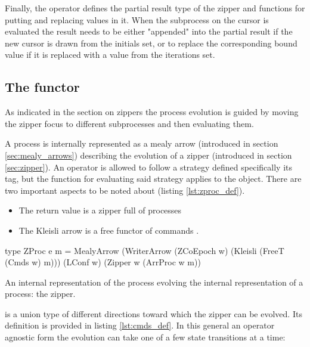 Finally, the operator defines the partial result type of the zipper
 and functions for putting and replacing values in
it. When the subprocess on the cursor is evaluated the result needs to
be either "appended" into the partial result if the new cursor is
drawn from the initials set, or to replace the corresponding bound
value if it is replaced with a value from the iterations set.

\subsection{The  functor}
\label{sec:cmds_functor}

As indicated in the section on zippers the process evolution is guided
by moving the zipper focus to different subprocesses and then
evaluating them.

A process is internally represented as a mealy arrow (introduced in
section \ref{sec:mealy_arrows}) describing the evolution of a zipper
(introduced in section \ref{sec:zipper}). An operator is allowed to
follow a strategy defined specifically its  tag,
but the function for evaluating said strategy applies to the
 object. There are two important aspects to be noted about
 (listing \ref{lst:zproc_def}).

\begin{itemize}
\item The return value is a zipper full of processes 
\item The Kleisli arrow is a free functor of commands .
\end{itemize}

\begin{code}
\begin{haskellcode}
type ZProc e m =
  MealyArrow
    (WriterArrow (ZCoEpoch w) (Kleisli (FreeT (Cmds w) m)))
    (LConf w)
    (Zipper w (ArrProc w m))
\end{haskellcode}
\label{lst:zproc_def}
\caption{An internal representation of the process evolving the internal representation of a process: the zipper.}
\end{code}


 is a union type of different directions toward which the
zipper can be evolved. Its definition is provided in listing
\ref{lst:cmds_def}. In this general an operator agnostic form the
evolution can take one of a few state transitions at a time:

